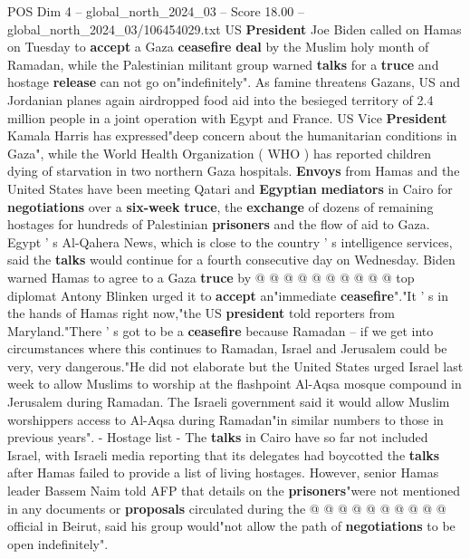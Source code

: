 \begin{textsample}{POS Dim 4 – global\_north\_2024\_03 – Score 18.00 – global\_north\_2024\_03/106454029.txt}  \label{ex:f4_pos_250}
US \textbf{President} Joe Biden called on Hamas on Tuesday to \textbf{accept} a Gaza \textbf{ceasefire} \textbf{deal} by the Muslim holy month of Ramadan, while the Palestinian militant group warned \textbf{talks} for a \textbf{truce} and hostage \textbf{release} can not go on"indefinitely".
As famine threatens Gazans, US and Jordanian planes again airdropped food aid into the besieged territory of 2.4 million people in a joint operation with Egypt and France.
US Vice \textbf{President} Kamala Harris has expressed"deep concern about the humanitarian conditions in Gaza", while the World Health Organization ( WHO ) has reported children dying of starvation in two northern Gaza hospitals. \textbf{Envoys} from Hamas and the United States have been meeting Qatari and \textbf{Egyptian} \textbf{mediators} in Cairo for \textbf{negotiations} over a \textbf{six-week} \textbf{truce}, the \textbf{exchange} of dozens of remaining hostages for hundreds of Palestinian \textbf{prisoners} and the flow of aid to Gaza.
Egypt ' s Al-Qahera News, which is close to the country ' s intelligence services, said the \textbf{talks} would continue for a fourth consecutive day on Wednesday.
Biden warned Hamas to agree to a Gaza \textbf{truce} by @ @ @ @ @ @ @ @ @ @ top diplomat Antony Blinken urged it to \textbf{accept} an"immediate \textbf{ceasefire}"."It ' s in the hands of Hamas right now,"the US \textbf{president} told reporters from Maryland."There ' s got to be a \textbf{ceasefire} because Ramadan -- if we get into circumstances where this continues to Ramadan, Israel and Jerusalem could be very, very dangerous."He did not elaborate but the United States urged Israel last week to allow Muslims to worship at the flashpoint Al-Aqsa mosque compound in Jerusalem during Ramadan.
The Israeli government said it would allow Muslim worshippers access to Al-Aqsa during Ramadan"in similar numbers to those in previous years". - Hostage list - The \textbf{talks} in Cairo have so far not included Israel, with Israeli media reporting that its delegates had boycotted the \textbf{talks} after Hamas failed to provide a list of living hostages.
However, senior Hamas leader Bassem Naim told AFP that details on the \textbf{prisoners}"were not mentioned in any documents or \textbf{proposals} circulated during the @ @ @ @ @ @ @ @ @ @ official in Beirut, said his group would"not allow the path of \textbf{negotiations} to be open indefinitely".

\end{textsample}
